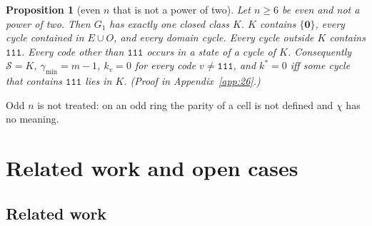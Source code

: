 \documentclass[10pt,a4paper]{article}
\newtheorem{proposition}[theorem]{Proposition}
\newcommand{\zero}{\mathbf{0}}                %
\newcommand{\gmin}{\gamma_{\min}}
\newcommand{\Sel}{\mathcal{S}}                %
\newcommand{\Gone}{G_1}                       %
\newcommand{\kst}{k^{*}}
\newcommand{\code}[1]{\mathtt{#1}}            %
\begin{document}
\begin{proposition}[even $n$ that is not a power of two]\label{26:prop:even}
Let $n\ge6$ be even and not a power of two. Then $\Gone$ has exactly one closed class $K$. $K$ contains $\{\zero\}$,
every cycle contained in $E\cup O$, and every domain cycle. Every cycle outside $K$ contains $\code{111}$. Every code
other than $\code{111}$ occurs in a state of a cycle of $K$. Consequently $\Sel=K$, $\gmin=m-1$, $k_v=0$ for every
code $v\ne\code{111}$, and $\kst=0$ iff some cycle that contains $\code{111}$ lies in $K$.
(Proof in Appendix~\ref{app:26}.)
\end{proposition}
\noindent Odd $n$ is not treated: on an odd ring the parity of a cell is not defined and $\chi$
has no meaning.

\section{Related work and open cases}\label{sec:relopen}

\subsection{Related work}\label{sec:related}
\end{document}
